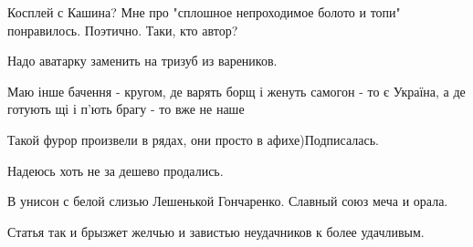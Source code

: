 \begin{itemize}
Косплей с Кашина? Мне про "сплошное непроходимое болото и топи" понравилось. Поэтично. Таки, кто автор?

 
Надо аватарку заменить на тризуб из вареников.

 
Маю інше бачення - кругом, де варять борщ і женуть самогон - то є Україна, а де готують щі і п'ють брагу - то вже не наше

 
Такой фурор произвели в рядах, они просто в афихе)Подписалась.

 
Надеюсь хоть не за дешево продались.

 
В унисон с белой слизью Лешенькой Гончаренко. Славный союз меча и орала.

 
Статья так и брызжет желчью и завистью неудачников к более удачливым.

 

\end{itemize}
